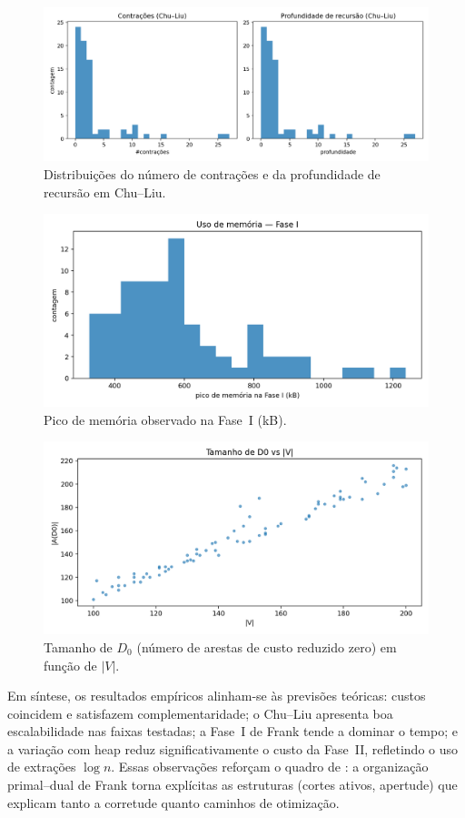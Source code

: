\documentclass[12pt,a4paper]{article}
\def\emph#1{#1}%
\begin{document}
\begin{figure}[H]
    \centering
    \includegraphics[width=.48\linewidth]{figures/fig_contractions_depth.png}
    \caption{Distribuições do número de contrações e da profundidade de recursão em \emph{Chu--Liu}.}
    \label{fig:contr-depth}
\end{figure}

\begin{figure}[H]
    \centering
    \includegraphics[width=.75\linewidth]{figures/fig_peakmem_hist.png}
    \caption{Pico de memória observado na Fase~I (kB).}
    \label{fig:peakmem}
\end{figure}

\begin{figure}[H]
    \centering
    \includegraphics[width=.75\linewidth]{figures/fig_d0_edges_vs_vertices.png}
    \caption{Tamanho de \(D_0\) (número de arestas de custo reduzido zero) em função de \(|V|\).}
    \label{fig:d0-vs-v}
\end{figure}

Em síntese, os resultados empíricos alinham-se às previsões teóricas: custos coincidem e satisfazem complementaridade; o \emph{Chu--Liu} apresenta boa escalabilidade nas faixas testadas; a Fase~I de Frank tende a dominar o tempo; e a variação com heap reduz significativamente o custo da Fase~II, refletindo o uso de extrações \(\log n\). Essas observações reforçam o quadro de \cite{frank2014,schrijver2003comb}: a organização primal--dual de Frank torna explícitas as estruturas (cortes ativos, apertude) que explicam tanto a corretude quanto caminhos de otimização.
\end{document}
